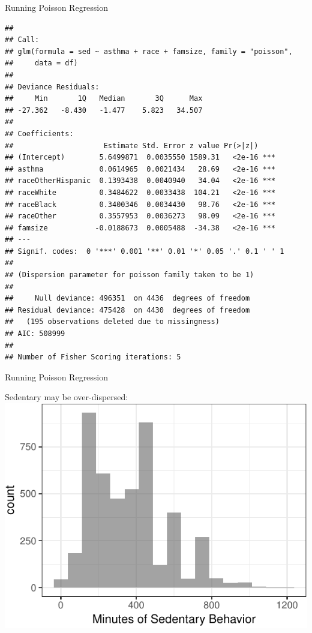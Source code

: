 \begin{frame}[fragile]{Running Poisson Regression}

\tiny

\begin{verbatim}
## 
## Call:
## glm(formula = sed ~ asthma + race + famsize, family = "poisson", 
##     data = df)
## 
## Deviance Residuals: 
##     Min       1Q   Median       3Q      Max  
## -27.362   -8.430   -1.477    5.823   34.507  
## 
## Coefficients:
##                     Estimate Std. Error z value Pr(>|z|)    
## (Intercept)        5.6499871  0.0035550 1589.31   <2e-16 ***
## asthma             0.0614965  0.0021434   28.69   <2e-16 ***
## raceOtherHispanic  0.1393438  0.0040940   34.04   <2e-16 ***
## raceWhite          0.3484622  0.0033438  104.21   <2e-16 ***
## raceBlack          0.3400346  0.0034430   98.76   <2e-16 ***
## raceOther          0.3557953  0.0036273   98.09   <2e-16 ***
## famsize           -0.0188673  0.0005488  -34.38   <2e-16 ***
## ---
## Signif. codes:  0 '***' 0.001 '**' 0.01 '*' 0.05 '.' 0.1 ' ' 1
## 
## (Dispersion parameter for poisson family taken to be 1)
## 
##     Null deviance: 496351  on 4436  degrees of freedom
## Residual deviance: 475428  on 4430  degrees of freedom
##   (195 observations deleted due to missingness)
## AIC: 508999
## 
## Number of Fisher Scoring iterations: 5
\end{verbatim}

\end{frame}

\begin{frame}{Running Poisson Regression}

\small
Sedentary may be over-dispersed:
\includegraphics{05_GeneralizedLinearModels_files/figure-beamer/unnamed-chunk-7-1.pdf}

\end{frame}

